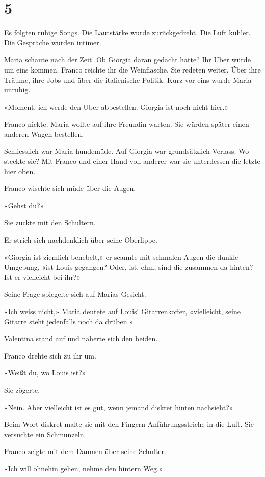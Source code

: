\chapter{5}\label{section-4}

Es folgten ruhige Songs. Die Lautstärke wurde zurückgedreht. Die Luft
kühler. Die Gespräche wurden intimer.

Maria schaute nach der Zeit. Ob Giorgia daran gedacht hatte? Ihr Uber
würde um eins kommen. Franco reichte ihr die Weinflasche. Sie redeten
weiter. Über ihre Träume, ihre Jobs und über die italienische Politik.
Kurz vor eins wurde Maria unruhig.

«Moment, ich werde den Uber abbestellen. Giorgia ist noch nicht hier.»

Franco nickte. Maria wollte auf ihre Freundin warten. Sie würden später
einen anderen Wagen bestellen.

Schliesslich war Maria hundemüde. Auf Giorgia war grundsätzlich Verlass.
Wo steckte sie? Mit Franco und einer Hand voll anderer war sie
unterdessen die letzte hier oben.

Franco wischte sich müde über die Augen.

«Gehst du?»

Sie zuckte mit den Schultern.

Er strich sich nachdenklich über seine Oberlippe.

«Giorgia ist ziemlich benebelt,» er scannte mit schmalen Augen die
dunkle Umgebung, «ist Louis gegangen? Oder, ist, ehm, sind die zusammen
da hinten? Ist er vielleicht bei ihr?»

Seine Frage spiegelte sich auf Marias Gesicht.

«Ich weiss nicht,» Maria deutete auf Louis` Gitarrenkoffer, «vielleicht,
seine Gitarre steht jedenfalls noch da drüben.»

Valentina stand auf und näherte sich den beiden.

Franco drehte sich zu ihr um.

«Weißt du, wo Louis ist?»

Sie zögerte.

«Nein. Aber vielleicht ist es gut, wenn jemand diskret hinten
nachsieht?»

Beim Wort diskret malte sie mit den Fingern Anführungsstriche in die
Luft. Sie versuchte ein Schmunzeln.

Franco zeigte mit dem Daumen über seine Schulter.

«Ich will ohnehin gehen, nehme den hintern Weg.»


